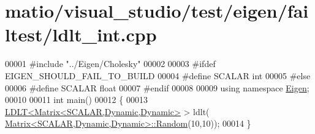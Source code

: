 \hypertarget{matio_2visual__studio_2test_2eigen_2failtest_2ldlt__int_8cpp_source}{}\section{matio/visual\+\_\+studio/test/eigen/failtest/ldlt\+\_\+int.cpp}
\label{matio_2visual__studio_2test_2eigen_2failtest_2ldlt__int_8cpp_source}

\begin{DoxyCode}
00001 \textcolor{preprocessor}{#include "../Eigen/Cholesky"}
00002 
00003 \textcolor{preprocessor}{#ifdef EIGEN\_SHOULD\_FAIL\_TO\_BUILD}
00004 \textcolor{preprocessor}{#define SCALAR int}
00005 \textcolor{preprocessor}{#else}
00006 \textcolor{preprocessor}{#define SCALAR float}
00007 \textcolor{preprocessor}{#endif}
00008 
00009 \textcolor{keyword}{using namespace }\hyperlink{namespace_eigen}{Eigen};
00010 
00011 \textcolor{keywordtype}{int} main()
00012 \{
00013   \hyperlink{group___cholesky___module_class_eigen_1_1_l_d_l_t}{LDLT<Matrix<SCALAR,Dynamic,Dynamic>} > ldlt(
      \hyperlink{group___core___module_class_eigen_1_1_matrix}{Matrix<SCALAR,Dynamic,Dynamic>::Random}(10,10));
00014 \}
\end{DoxyCode}

